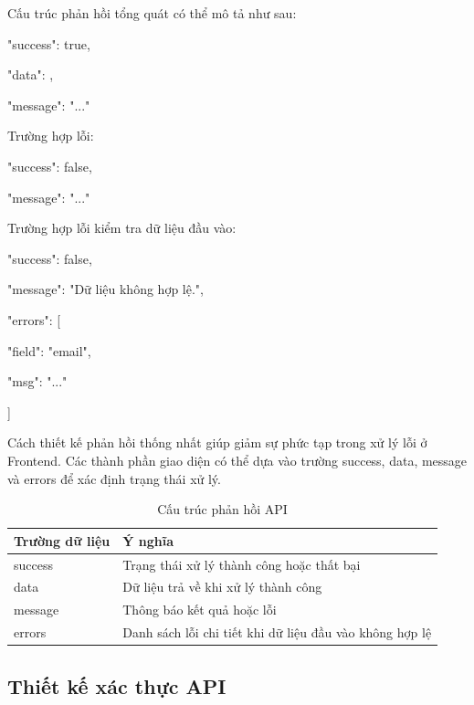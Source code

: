 \documentclass[12pt, a4paper]{report}
\begin{document}
Cấu trúc phản hồi tổng quát có thể mô tả như sau:

{

  "success": true,

  "data": {},

  "message": "..."

}

Trường hợp lỗi:

{

  "success": false,

  "message": "..."

}

Trường hợp lỗi kiểm tra dữ liệu đầu vào:

{

  "success": false,

  "message": "Dữ liệu không hợp lệ.",

  "errors": [

    {

      "field": "email",

      "msg": "..."

    }

  ]

}

Cách thiết kế phản hồi thống nhất giúp giảm sự phức tạp trong xử lý lỗi ở Frontend. Các thành phần giao diện có thể dựa vào trường success, data, message và errors để xác định trạng thái xử lý.

\begin{table}[htbp]
\centering
\caption{Cấu trúc phản hồi API}
\begin{tabular}{|p{5cm}|p{10cm}|}
\hline
\textbf{Trường dữ liệu} & \textbf{Ý nghĩa} \\
\hline
success & Trạng thái xử lý thành công hoặc thất bại \\
\hline
data & Dữ liệu trả về khi xử lý thành công \\
\hline
message & Thông báo kết quả hoặc lỗi \\
\hline
errors & Danh sách lỗi chi tiết khi dữ liệu đầu vào không hợp lệ \\
\hline
\end{tabular}
\end{table}
\subsection{Thiết kế xác thực API}
\end{document}
